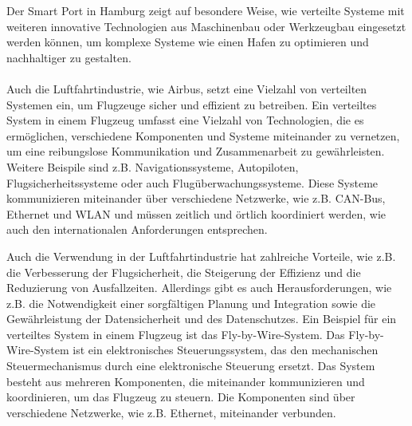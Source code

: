 Der Smart Port in Hamburg zeigt auf besondere Weise, wie verteilte Systeme mit weiteren innovative Technologien aus Maschinenbau oder Werkzeugbau  eingesetzt werden können\cite{Bockenfeld2020}, um komplexe Systeme wie einen Hafen zu optimieren und nachhaltiger zu gestalten.
\\\\
Auch die Luftfahrtindustrie, wie Airbus, setzt eine Vielzahl von verteilten Systemen ein, um Flugzeuge sicher und effizient zu betreiben. Ein verteiltes System in einem Flugzeug umfasst eine Vielzahl von Technologien, die es ermöglichen, verschiedene Komponenten und Systeme miteinander zu vernetzen, um eine reibungslose Kommunikation und Zusammenarbeit zu gewährleisten\cite{chen2017distributed}. Weitere Beispile sind z.B. Navigationssysteme, Autopiloten, Flugsicherheitssysteme oder auch Flugüberwachungssysteme. Diese Systeme kommunizieren miteinander über verschiedene Netzwerke, wie z.B. CAN-Bus, Ethernet und WLAN und müssen zeitlich und örtlich koordiniert werden, wie auch den internationalen Anforderungen entsprechen.

Auch die Verwendung in der Luftfahrtindustrie hat zahlreiche Vorteile, wie z.B. die Verbesserung der Flugsicherheit, die Steigerung der Effizienz und die Reduzierung von Ausfallzeiten. Allerdings gibt es auch Herausforderungen, wie z.B. die Notwendigkeit einer sorgfältigen Planung und Integration sowie die Gewährleistung der Datensicherheit und des Datenschutzes. Ein Beispiel für ein verteiltes System in einem Flugzeug ist das Fly-by-Wire-System. Das Fly-by-Wire-System ist ein elektronisches Steuerungssystem, das den mechanischen Steuermechanismus durch eine elektronische Steuerung ersetzt\cite{tian2017fault}. Das System besteht aus mehreren Komponenten, die miteinander kommunizieren und koordinieren, um das Flugzeug zu steuern. Die Komponenten sind über verschiedene Netzwerke, wie z.B. Ethernet\cite{wang2018architecture}, miteinander verbunden.

